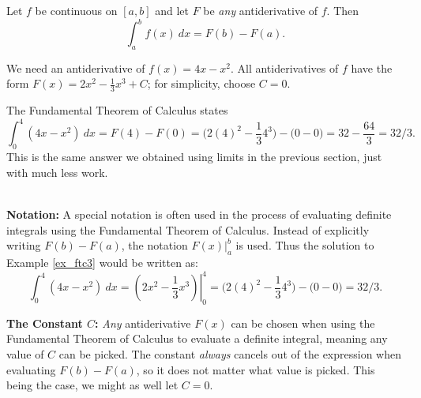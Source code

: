 {Let $f$ be continuous on $[a,b]$ and let $F$ be \textit{any} antiderivative of $f$. Then $$\int_a^b f(x)\ dx = F(b) - F(a).$$
}

{We need an antiderivative of $f(x)=4x-x^2$. All antiderivatives of $f$ have the form $F(x) = 2x^2-\frac13x^3+C$; for simplicity, choose $C=0$.

The Fundamental Theorem of Calculus states 
		$$\int_0^4(4x-x^2)\ dx = F(4)-F(0) = \big(2(4)^2-\frac134^3\big)-\big(0-0\big) = 32-\frac{64}3 = 32/3.$$
This is the same answer we obtained using limits in the previous section, just with much less work.
}\\

\noindent\textbf{Notation:} A special notation is often used in the process of evaluating definite integrals using the Fundamental Theorem of Calculus. Instead of explicitly writing $F(b)-F(a)$, the notation $F(x)\Big|_a^b$ is used. Thus the solution to Example \ref{ex_ftc3} would be written as:
	$$\int_0^4(4x-x^2)\ dx = \left.\left(2x^2-\frac13x^3\right)\right|_0^4 = \big(2(4)^2-\frac134^3\big)-\big(0-0\big) =  32/3.$$

\noindent\textbf{The Constant $C$:} \textit{Any} antiderivative $F(x)$ can be chosen when using the Fundamental Theorem of Calculus to evaluate a definite integral, meaning any value of $C$ can be picked. The constant \textit{always} cancels out of the expression when evaluating $F(b)-F(a)$, so it does not matter what value is picked. This being the case, we might as well let $C=0$.\\


